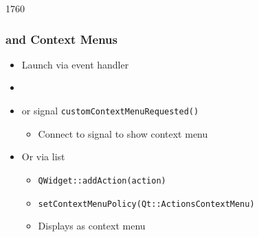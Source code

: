                  
\begin{slide}[fragile]{1760}\frametitle{ and Context Menus}
  \begin{itemize}
 \item Launch via event handler
  \item [] \begin{cpp}
void MyWidget::contextMenuEvent(event) {
 m_contextMenu->exec(event->globalPos());    
    \end{cpp}
  \item or signal \texttt{customContextMenuRequested()}
    \begin{itemize}
    \item Connect to signal to show context menu
    \end{itemize}
\item Or via  list
    \begin{itemize}
    \item \texttt{QWidget::addAction(action)}
    \item \texttt{setContextMenuPolicy(Qt::ActionsContextMenu)}
    \item Displays  as context menu
    \end{itemize}
\end{itemize}
\end{slide}


